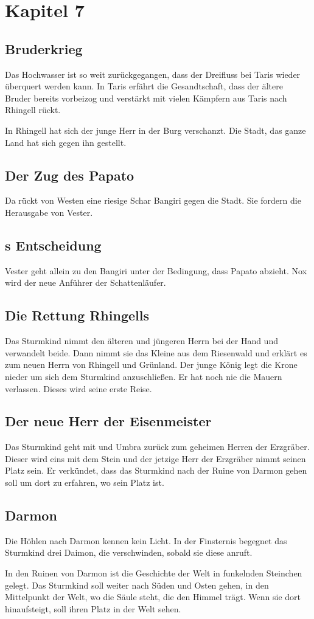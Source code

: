 \chapter{Kapitel 7}
\section{Bruderkrieg}
Das Hochwasser ist so weit zurückgegangen, dass der Dreifluss bei Taris wieder überquert werden kann. In Taris erfährt die Gesandtschaft, dass der ältere Bruder bereits vorbeizog und verstärkt mit vielen Kämpfern aus Taris nach Rhingell rückt. 

In Rhingell hat sich der junge Herr in der Burg verschanzt. Die Stadt, das ganze Land hat sich gegen ihn gestellt. 

\section{Der Zug des Papato}
Da rückt von Westen eine riesige Schar Bangiri gegen die Stadt. Sie fordern die Herausgabe von Vester.

\section{{\Eno}s Entscheidung}
Vester geht allein zu den Bangiri unter der Bedingung, dass Papato abzieht. Nox wird der neue Anführer der Schattenläufer.

\section{Die Rettung Rhingells}
Das Sturmkind nimmt den älteren und jüngeren Herrn bei der Hand und verwandelt beide. Dann nimmt sie das Kleine aus dem Riesenwald und erklärt es zum neuen Herrn von Rhingell und Grünland. Der junge König legt die Krone nieder um sich dem Sturmkind anzuschließen. Er hat noch nie die Mauern  verlassen. Dieses wird seine erste Reise.

\section{Der neue Herr der Eisenmeister}
Das Sturmkind geht mit \Safir und Umbra zurück zum geheimen Herren der Erzgräber. Dieser wird eins mit dem Stein und der jetzige Herr der Erzgräber nimmt seinen Platz sein. Er verkündet, dass das Sturmkind nach der Ruine von Darmon gehen soll um dort zu erfahren, wo sein Platz ist.

\section{Darmon}
Die Höhlen nach Darmon kennen kein Licht. In der Finsternis begegnet das Sturmkind drei Daimon, die verschwinden, sobald sie diese anruft.

In den Ruinen von Darmon ist die Geschichte der Welt in funkelnden Steinchen gelegt. Das Sturmkind soll weiter nach Süden und Osten gehen, in den Mittelpunkt der Welt, wo die Säule steht, die den Himmel trägt. Wenn sie dort hinaufsteigt, soll ihren Platz in der Welt sehen.
